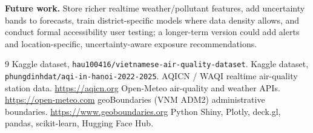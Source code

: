 \documentclass[a4paper]{article}
\begin{document}
\textbf{Future work.} Store richer realtime weather/pollutant features, add uncertainty bands to forecasts,
train district-specific models where data density allows, and conduct formal accessibility user testing;
a longer-term version could add alerts and location-specific, uncertainty-aware exposure recommendations.

\begin{thebibliography}{9}
\small
{} Kaggle dataset, \texttt{hau100416/vietnamese-air-quality-dataset}.
 Kaggle dataset, \texttt{phungdinhdat/aqi-in-hanoi-2022-2025}.
 AQICN / WAQI realtime air-quality station data. \url{https://aqicn.org}
 Open-Meteo air-quality and weather APIs. \url{https://open-meteo.com}
 geoBoundaries (VNM ADM2) administrative boundaries. \url{https://www.geoboundaries.org}
 Python Shiny, Plotly, deck.gl, pandas, scikit-learn, Hugging Face Hub.
\end{thebibliography}
\end{document}

